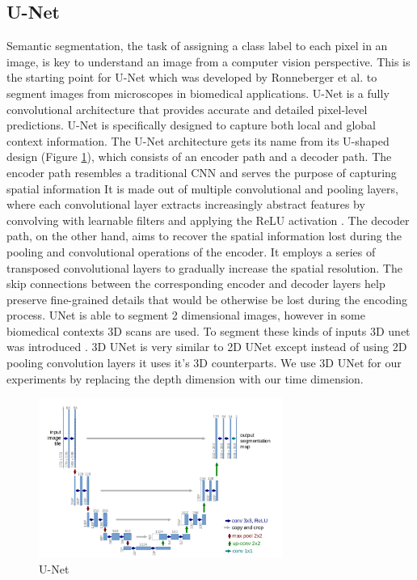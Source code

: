\subsection{U-Net}
Semantic segmentation, the task of assigning a class label to each pixel in an image, is key to understand an image from a computer vision perspective.
This is the starting point for U-Net which was developed by Ronneberger et al. \cite{ronneberger-2015} to segment images from microscopes in biomedical applications.
U-Net is a fully convolutional architecture that provides accurate and detailed pixel-level predictions.
U-Net is specifically designed to capture both local and global context information.
The U-Net architecture gets its name from its U-shaped design (Figure \ref{fig:unet}), which consists of an encoder path and a decoder path.
The encoder path resembles a traditional CNN and serves the purpose of capturing spatial information
It is made out of multiple convolutional and pooling layers, where each convolutional layer extracts increasingly abstract features by convolving with learnable filters and applying the ReLU activation  .
The decoder path, on the other hand, aims to recover the spatial information lost during the pooling and convolutional operations of the encoder.
It employs a series of transposed convolutional layers to gradually increase the spatial resolution.
The skip connections between the corresponding encoder and decoder layers help preserve fine-grained details that would be otherwise be lost during the encoding process.
UNet is able to segment 2 dimensional images, however in some biomedical contexts 3D scans are used. To segment these kinds of inputs 3D unet was introduced \cite{cicek-2016}.
3D UNet is very similar to 2D UNet except instead of using 2D pooling convolution layers it uses it's 3D counterparts.
We use 3D UNet for our experiments by replacing the depth dimension with our time dimension.

\begin{figure}
  \includegraphics[width=8cm]{../images/unet.png}
  \caption[short]{U-Net}
  \label{fig:unet}
\end{figure}

